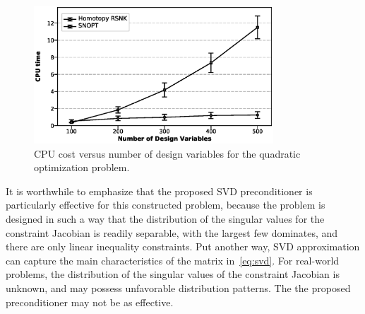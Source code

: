\begin{figure}[tbp]
  \centering
  \includegraphics[clip,width=0.8\textwidth]{./figs/chap4_test/quadratic_random_100_nocolor.eps}%
  \caption{CPU cost versus number of design variables for the quadratic
    optimization problem.\label{fig:quad_scale}}
\end{figure}

It is worthwhile to emphasize that the proposed SVD preconditioner is particularly effective for this constructed problem, because the problem is designed in such a way that the distribution of the singular values for the constraint Jacobian is readily separable, with the largest few dominates, and there are only linear inequality constraints. Put another way, SVD approximation can capture the main characteristics of the matrix in~\eqref{eq:svd}. For real-world problems, the distribution of the singular values of the constraint Jacobian is unknown, and may possess unfavorable distribution patterns. The the proposed preconditioner may not be as effective.  






